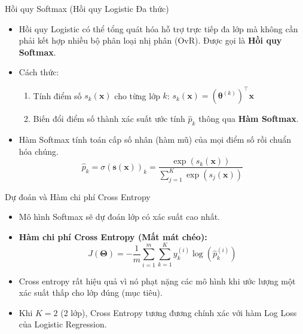 \documentclass[aspectratio=169]{beamer}
\begin{document}
\begin{frame}{Hồi quy Softmax (Hồi quy Logistic Đa thức)}
\begin{itemize}
    \item Hồi quy Logistic có thể tổng quát hóa hỗ trợ trực tiếp đa lớp mà không cần phải kết hợp nhiều bộ phân loại nhị phân (OvR). Được gọi là \textbf{Hồi quy Softmax}.
    \item Cách thức: 
    \begin{enumerate}
        \item Tính điểm số $s_k(\mathbf{x})$ cho từng lớp $k$: $s_k(\mathbf{x}) = (\boldsymbol{\theta}^{(k)})^\top \mathbf{x}$
        \item Biến đổi điểm số thành xác suất ước tính $\hat{p}_k$ thông qua \textbf{Hàm Softmax}.
    \end{enumerate}
    \item Hàm Softmax tính toán cấp số nhân (hàm mũ) của mọi điểm số rồi chuẩn hóa chúng.
    \begin{equation}
    \hat{p}_k = \sigma(\mathbf{s}(\mathbf{x}))_k = \frac{\exp(s_k(\mathbf{x}))}{\sum_{j=1}^{K} \exp(s_j(\mathbf{x}))}
    \end{equation}
\end{itemize}
\end{frame}

\begin{frame}{Dự đoán và Hàm chi phí Cross Entropy}
\begin{itemize}
    \item Mô hình Softmax sẽ dự đoán lớp có xác suất cao nhất.
    \item \textbf{Hàm chi phí Cross Entropy (Mất mát chéo):} 
    \begin{equation}
    J(\boldsymbol{\Theta}) = -\frac{1}{m} \sum_{i=1}^{m} \sum_{k=1}^{K} y_k^{(i)} \log\left(\hat{p}_k^{(i)}\right)
    \end{equation}
    \item Cross entropy rất hiệu quả vì nó phạt nặng các mô hình khi ước lượng một xác suất thấp cho lớp đúng (mục tiêu).
    \item Khi $K = 2$ (2 lớp), Cross Entropy tương đương chính xác với hàm Log Loss của Logistic Regression.
\end{itemize}
\end{frame}
\end{document}
